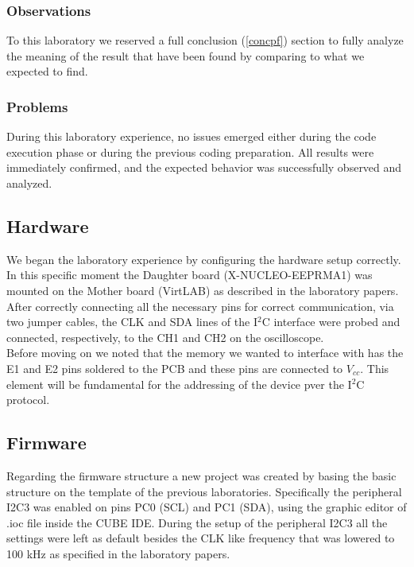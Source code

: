 \documentclass[../main.tex]{subfiles}
\begin{document}
\subsubsection*{Observations}

To this laboratory we reserved a full conclusion (\autoref{concpf}) section to fully analyze the meaning of the result that have been found by comparing to what we expected to find.


\subsubsection*{Problems}

During this laboratory experience, no issues emerged either during the code execution phase or during the previous coding preparation. 
All results were immediately confirmed, and the expected behavior was successfully observed and analyzed.



\subsection{Hardware}

We began the laboratory experience by configuring the hardware setup correctly.
In this specific moment the Daughter board (X-NUCLEO-EEPRMA1) was mounted on the Mother board (VirtLAB) as described in the laboratory papers.
After correctly connecting all the necessary pins for correct communication, via two jumper cables, the CLK and SDA lines of the I$^2$C interface were probed and connected, respectively, to the CH1 and CH2 on the oscilloscope.\\

Before moving on we noted that the memory we wanted to interface with has the E1 and E2 pins soldered to the PCB and these pins are connected to $V_{cc}$. This element will be fundamental for the addressing of the device pver the I$^2$C protocol.



\subsection{Firmware}

Regarding the firmware structure a new project was created by basing the basic structure on the template of the previous laboratories.
Specifically the peripheral I2C3 was enabled on pins PC0 (SCL) and PC1 (SDA), using the graphic editor of .ioc file inside the CUBE IDE.
During the setup of the peripheral I2C3 all the settings were left as default besides the CLK like frequency that was lowered to 100 kHz as specified in the laboratory papers.\\
\end{document}
